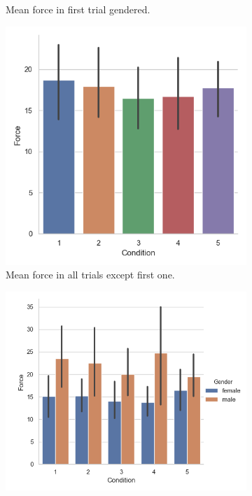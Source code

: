 \begin{figure}[H]
\begin{subfigure}[b]{0.5\textwidth}
     \caption{Mean force in first trial gendered.}
     \label{fig:meanF1stGen}
 \end{subfigure}
  \begin{subfigure}[b]{0.5\textwidth}
     \centering
     \includegraphics[scale=0.5]{Files/Plots/force_all_but_1.png}
     \caption{Mean force in all trials except first one.}
     \label{fig:meanFRest}
 \end{subfigure}
     \begin{subfigure}[b]{0.5\textwidth}
     \centering
     \includegraphics[scale=0.5]{Files/Plots/forc_all_but_1_gen.png}

\end{subfigure}
\end{figure}

